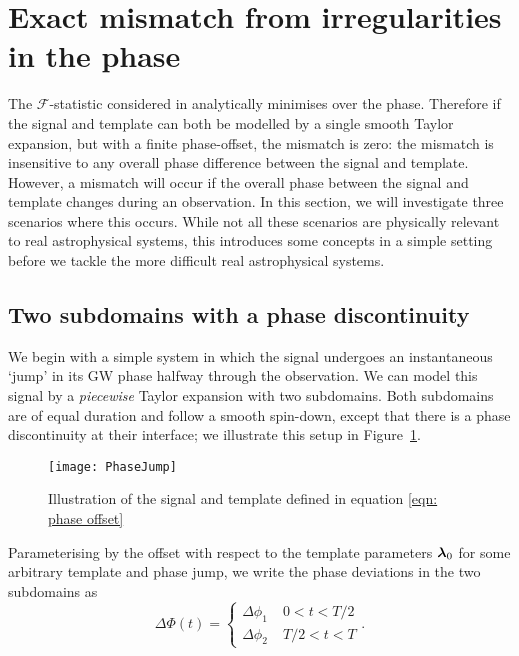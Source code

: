 \documentclass[../full_thesis/full_thesis.tex]{subfiles}
\begin{document}
\section{Exact mismatch from irregularities in the phase}
\label{sec: mismatch from differences in the gw phase}

The $\mathcal{F}$-statistic considered in \citet{Brady1998} analytically
minimises over the phase. Therefore if the signal and template can both be
modelled by a single smooth Taylor expansion, but with a finite phase-offset,
the mismatch is zero: the mismatch is insensitive to any overall phase
difference between the signal and template. However, a mismatch will occur if
the overall phase between the signal and template changes during an
observation. In this section, we will investigate three scenarios where this
occurs. While not all these scenarios are physically relevant to real astrophysical
systems, this introduces some concepts in a simple setting before we tackle
the more difficult real astrophysical systems.

\subsection{Two subdomains with a phase discontinuity}
\label{sec: Two segments with a phase offset}

We begin with a simple system in which the signal undergoes an instantaneous
`jump' in its GW phase halfway through the observation. We can model this
signal by a \emph{piecewise} Taylor expansion with two subdomains.  Both
subdomains are of equal duration and follow a smooth spin-down, except that
there is a phase discontinuity at their interface; we illustrate this setup in
Figure~\ref{fig: PhaseJump}.
\begin{figure}[htb]
    \centering
    \texttt{[image: PhaseJump]}
    \caption{Illustration of the signal and template defined in equation
        \eqref{eqn: phase offset}}
    \label{fig: PhaseJump}
\end{figure}
Parameterising by the offset with respect to the template parameters ${\bm{\lambda}}_{0}$ for some
arbitrary template and phase jump, we write the phase deviations in the two
subdomains as
\begin{equation}
 \Delta\Phi(t) = \left\{
\begin{array}{cr}
\Delta \phi_{1}& \; 0 < t < T/2 \\
\Delta \phi_{2} & \;  T/2 < t < T
\end{array}.
\right.
\label{eqn: phase offset}
\end{equation}
\end{document}

